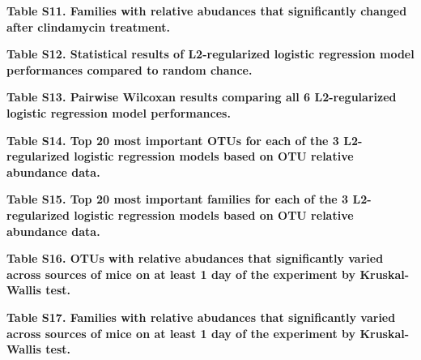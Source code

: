 \documentclass[11pt,]{article}
\begin{document}
\textbf{Table S11. Families with relative abudances that significantly
changed after clindamycin treatment.}

\textbf{Table S12. Statistical results of L2-regularized logistic
regression model performances compared to random chance.}

\textbf{Table S13. Pairwise Wilcoxan results comparing all 6
L2-regularized logistic regression model performances.}

\textbf{Table S14. Top 20 most important OTUs for each of the 3
L2-regularized logistic regression models based on OTU relative
abundance data.}

\textbf{Table S15. Top 20 most important families for each of the 3
L2-regularized logistic regression models based on OTU relative
abundance data.}

\textbf{Table S16. OTUs with relative abudances that significantly
varied across sources of mice on at least 1 day of the experiment by
Kruskal-Wallis test.}

\textbf{Table S17. Families with relative abudances that significantly
varied across sources of mice on at least 1 day of the experiment by
Kruskal-Wallis test.}
\end{document}
